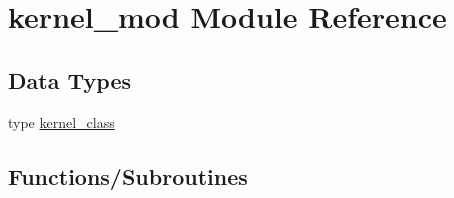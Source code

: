 \hypertarget{namespacekernel__mod}{}\section{kernel\+\_\+mod Module Reference}
\label{namespacekernel__mod}
\subsection*{Data Types}
\begin{DoxyCompactItemize}
\item 
type \mbox{\hyperlink{structkernel__mod_1_1kernel__class}{kernel\+\_\+class}}
\end{DoxyCompactItemize}
\subsection*{Functions/\+Subroutines}
